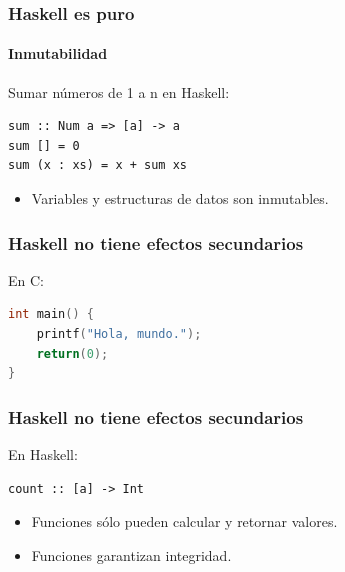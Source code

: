 \documentclass{beamer}
\begin{document}

\begin{frame}[fragile]
  \frametitle{Haskell es puro}
  \framesubtitle{Inmutabilidad}

Sumar números de 1 a n en Haskell: 

\begin{lstlisting}
sum :: Num a => [a] -> a
sum [] = 0
sum (x : xs) = x + sum xs
\end{lstlisting}

\vspace{0.3cm}

\begin{itemize}
\item Variables y estructuras de datos son inmutables.
\end{itemize}

\end{frame}


\begin{frame}[fragile]
  \frametitle{Haskell no tiene efectos secundarios}

En C:

\begin{lstlisting}[language=c]
int main() {
    printf("Hola, mundo.");
    return(0);
}
\end{lstlisting}

\end{frame}


\begin{frame}[fragile]
  \frametitle{Haskell no tiene efectos secundarios}

En Haskell: 

\begin{lstlisting}
count :: [a] -> Int
\end{lstlisting}

\vspace{0.3cm}

\begin{itemize}
\item Funciones sólo pueden calcular y retornar valores. 
\item Funciones garantizan integridad.
\end{itemize}

\end{frame}
\end{document}
